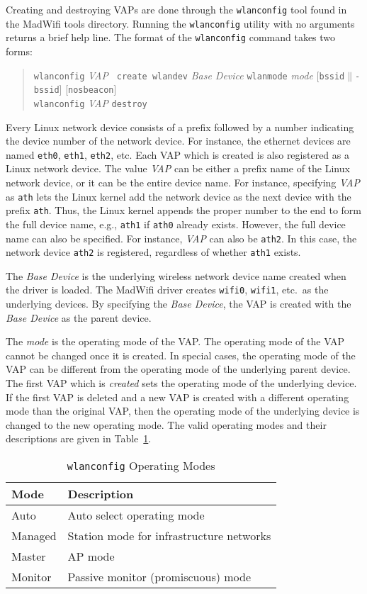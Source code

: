 \documentclass[10pt,fullpage]{article}
\newcommand{\mytt}[1]{{\texttt{#1}}}
\newcommand{\bv}{\begin{verse}}
\newcommand{\ev}{\end{verse}}
\newcommand{\clival}[1]{{\emph{#1}}}
\begin{document}
Creating and destroying VAPs are done through the \mytt{wlanconfig}
tool found in the MadWifi tools directory.  Running the
\mytt{wlanconfig} utility with no arguments returns a brief help
line.  The format of the \mytt{wlanconfig} command takes two forms:
\bv
\mytt{wlanconfig} \clival{VAP} \mytt{ create wlandev}
\clival{Base Device} \mytt{wlanmode} \clival{mode}
[\mytt{bssid}$\|$\mytt{-bssid}] [\mytt{nosbeacon}]\\
\mytt{wlanconfig} \clival{VAP} \mytt{destroy}
\ev
Every Linux network device consists of a prefix followed by a number
indicating the device number of the network device.  For instance, the
ethernet devices are named \mytt{eth0}, \mytt{eth1}, \mytt{eth2},
etc.  Each VAP which is created is also registered as a Linux network
device.  The value \clival{VAP} can be either a prefix name of the Linux
network device, or it can be the entire device name.  For instance,
specifying \clival{VAP} as \mytt{ath} lets the Linux kernel add the
network device as the next device with the prefix \mytt{ath}.  Thus,
the Linux kernel appends the proper number to the end to form the full
device name, e.g., \mytt{ath1} if \mytt{ath0} already exists.
However, the full device name can also be specified.  For instance,
\clival{VAP} can also be \mytt{ath2}.  In this case, the network
device \mytt{ath2} is registered, regardless of whether \mytt{ath1}
exists.

The \clival{Base Device} is the underlying wireless network device
name created when the driver is loaded.  The MadWifi driver creates
\mytt{wifi0}, \mytt{wifi1}, etc.\ as the underlying devices.  By
specifying the \clival{Base Device}, the VAP is created with the
\clival{Base Device} as the parent device.

The \clival{mode} is the operating mode of the VAP.  The operating
mode of the VAP cannot be changed once it is created.  In special
cases, the operating
mode of the VAP can be different from the operating mode of the
underlying parent device.  The first VAP which is \emph{created} sets
the operating mode of the underlying device.  If the first VAP is
deleted and a new VAP is created with a different operating mode than
the original VAP, then the operating mode of the underlying device is
changed to the new operating mode.  The valid operating modes and
their descriptions are given in Table~\ref{tab:wlanOpMode}.
\begin{table}[h*]
  \centering
  \begin{tabular}{|l|l|} \hline
    Mode & Description \\ \hline
    Auto &  Auto select operating mode \\
    Managed & Station mode for infrastructure networks\\
    Master & AP mode \\
    Monitor & Passive monitor (promiscuous) mode \\ \hline
  \end{tabular}
  \caption{\mytt{wlanconfig} Operating Modes}
  \label{tab:wlanOpMode}
\end{table}
\end{document}
